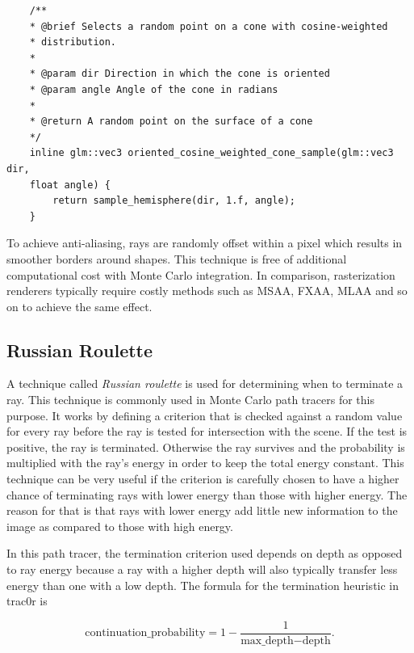 \documentclass[
  twoside,
  11pt, a4paper,
  footinclude=true,
  headinclude=true,
  cleardoublepage=empty
]{scrreprt}
\begin{document}
\begin{verbatim}
    /**
    * @brief Selects a random point on a cone with cosine-weighted
    * distribution.
    *
    * @param dir Direction in which the cone is oriented
    * @param angle Angle of the cone in radians
    *
    * @return A random point on the surface of a cone
    */
    inline glm::vec3 oriented_cosine_weighted_cone_sample(glm::vec3 dir,
    float angle) {
        return sample_hemisphere(dir, 1.f, angle);
    }
\end{verbatim}

To achieve anti-aliasing, rays are randomly offset within a pixel which results in smoother borders
around shapes. This technique is free of additional computational cost with Monte Carlo integration.
In comparison, rasterization renderers typically require costly methods such as MSAA, FXAA, MLAA
and so on \cite{site:eurogamer-antialiasing} to achieve the same effect.

\subsection{Russian Roulette}
A technique called \emph{Russian roulette} \cite{caflisch1998monte} is used for determining when to terminate a ray. This
technique is commonly used in Monte Carlo path tracers for this purpose. It works by defining a
criterion that is checked against a random value for every ray before the ray is tested for
intersection with the scene. If the test is positive, the ray is terminated. Otherwise the ray
survives and the probability is multiplied with the ray's energy in order to keep the total energy
constant. This technique can be very useful if the criterion is carefully chosen to have a higher
chance of terminating rays with lower energy than those with higher energy. The reason for that is
that rays with lower energy add little new information to the image as compared to those with high
energy. 

In this path tracer, the termination criterion used depends on depth as opposed to ray energy
because a ray with a higher depth will also typically transfer less energy than one with a low
depth. The formula for the termination heuristic in trac0r is

\[\text{continuation\_probability} = 1 - \frac 1 {\text{max\_depth} - \text{depth}}.\]
\end{document}
